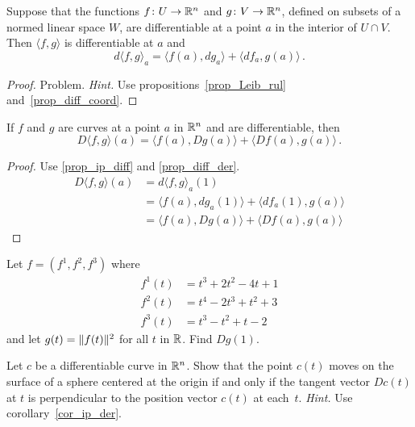 \begin{prop}\label{prop_ip_diff}  Suppose that the functions $f \colon U \rightarrow \mathbb{R}^n$ and
$g\colon V \rightarrow \mathbb{R}^n$, defined on subsets of a normed linear space $W$, are differentiable at
a point $a$ in the interior of $U \cap V$.  Then $\langle f,g \rangle$ is differentiable at
$a$ and
  \[ d\langle f,g \rangle_a = \langle f(a),dg_a \rangle + \langle df_a,g(a) \rangle\,. \]
\end{prop}

\begin{proof} Problem.  \emph{Hint.}  Use propositions~\ref{prop_Leib_rul}
and~\ref{prop_diff_coord}.  \ns
\end{proof}

\begin{cor}\label{cor_ip_der} If $f$ and $g$ are curves at a point $a$ in $\mathbb{R}^n$ and are
differentiable, then
  \[ D\langle f,g \rangle (a) = \langle f(a),Dg(a) \rangle + \langle Df(a), g(a) \rangle\,. \]
\end{cor}

\begin{proof} Use \ref{prop_ip_diff} and \ref{prop_diff_der}.
  \begin{align*}
     D \langle f,g \rangle (a) &= d\langle f,g \rangle_a(1) \\
              &= \langle f(a),dg_a(1) \rangle + \langle df_a(1),g(a) \rangle \\
              &= \langle f(a),Dg(a) \rangle + \langle Df(a),g(a) \rangle
  \end{align*}
\end{proof}

\begin{prob} Let $f = (f^1,f^2,f^3)$ where
  \begin{align*}
        f^1(t) &= t^3 + 2t^2 - 4t + 1  \\
        f^2(t) &= t^4 - 2t^3 + t^2 + 3 \\
        f^3(t) &= t^3 - t^2 + t - 2
  \end{align*}
and let $g(t) = \lVert f(t)\rVert^2$ for all $t$ in $\mathbb{R}$.  Find $Dg(1)$.
\end{prob}

\begin{prob}  Let $c$ be a differentiable curve in $\mathbb{R}^n$.  Show that the point $c(t)$ moves
on the surface of a sphere centered at the origin if and only if the tangent vector $Dc(t)$ at
$t$ is perpendicular to the position vector $c(t)$ at each~$t$. \emph{Hint.}  Use
corollary~\ref{cor_ip_der}.
\end{prob}









